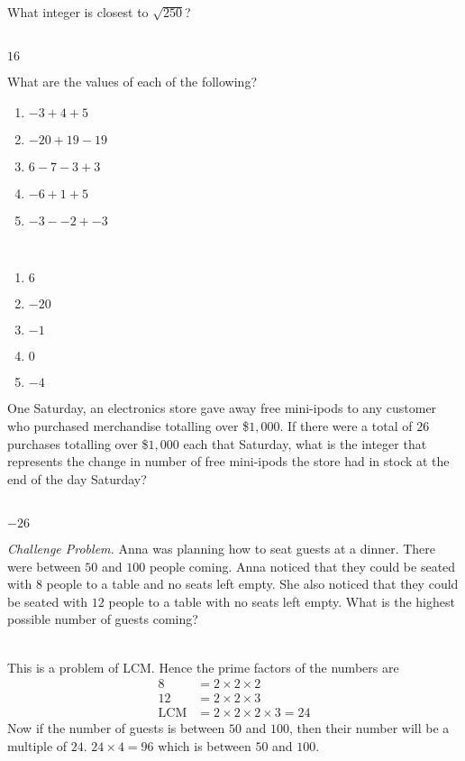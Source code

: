 \documentclass[addpoints,12pt]{exam}
\begin{document}
\begin{questions}
 \question What integer is closest to $\sqrt{250}$?
	\ifprintanswers
	  \begin{solution}\\
		$16$
	  \end{solution}
	\else
	  \makeemptybox{1.33in}
	\fi
 
 \question What are the values of each of the following?
	\begin{enumerate}
	 \item $-3+4+5$
	 \item $-20+19-19$
	 \item $6-7-3+3$
	 \item $-6+1+5$
	 \item $-3--2+-3$
	\end{enumerate}
	\ifprintanswers
	  \begin{solution}\\
		\begin{enumerate}
		 \item $6$
		 \item $-20$
		 \item $-1$
		 \item $0$
		 \item $-4$
		\end{enumerate}
	  \end{solution}
	\else
	  \makeemptybox{1.33in}
	\fi
 \question One Saturday, an electronics store gave away free mini-ipods to any customer who 
purchased merchandise totalling over \$$1,000$. If there were a total of $26$ purchases totalling 
over \$$1,000$ each that Saturday, what is the integer that represents the change in number of free 
mini-ipods the store had in stock at the end of the day Saturday?
	\ifprintanswers
	  \begin{solution}\\
		$-26$
	  \end{solution}
	\else
	  \makeemptybox{1.33in}
	\fi
 
 \question \emph{Challenge Problem.} Anna was planning how to seat guests at a dinner. There 
were between $50$ and $100$ people coming. Anna noticed that they could be seated with $8$ people 
to a table and no seats left empty. She also noticed that they could be seated with $12$ people to 
a table with no seats left empty. What is the highest possible number of guests coming?
	\ifprintanswers
	  \begin{solution}\\
		This is a problem of LCM. Hence the prime factors of the numbers are
		\begin{align}
		  8 &= 2\times2\times2 \\
		  12 &= 2\times2\times3 \\
		  \text{LCM} &= 2\times2\times2\times3 = 24
		\end{align}
	Now if the number of guests is between $50$ and $100$, then their number will be a multiple of 
$24$. $24\times4=96$ which is between $50$ and $100$.
	  \end{solution}
	\else
	  \makeemptybox{1.33in}
	\fi
\end{questions}
\vspace*{1cm}
\end{document}
